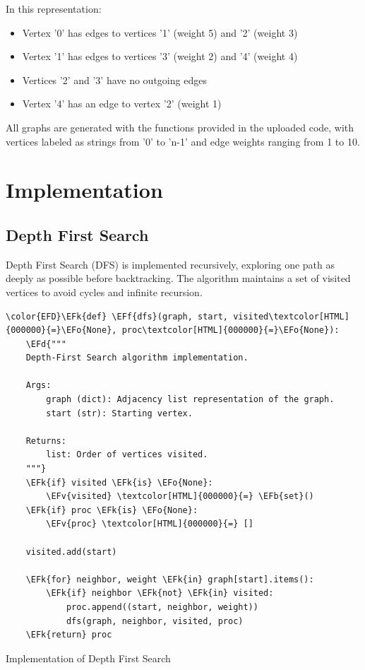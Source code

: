 \documentclass[a4paper,12pt]{article}
\newcommand{\EFd}[1]{\textcolor{EFd}{#1}} %
\newcommand{\EFk}[1]{\textcolor{EFk}{#1}} %
\newcommand{\EFb}[1]{\textcolor{EFb}{#1}} %
\newcommand{\EFf}[1]{\textcolor{EFf}{#1}} %
\newcommand{\EFv}[1]{\textcolor{EFv}{#1}} %
\newcommand{\EFo}[1]{\textcolor{EFo}{#1}} %
\begin{document}
In this representation:
\begin{itemize}
\item Vertex '0' has edges to vertices '1' (weight 5) and '2' (weight 3)
\item Vertex '1' has edges to vertices '3' (weight 2) and '4' (weight 4)
\item Vertices '2' and '3' have no outgoing edges
\item Vertex '4' has an edge to vertex '2' (weight 1)
\end{itemize}

All graphs are generated with the functions provided in the uploaded code, with vertices labeled as strings from '0' to 'n-1' and edge weights ranging from 1 to 10.
\section{Implementation}
\label{sec:org1ac15dd}
\subsection{Depth First Search}
\label{sec:orgfe46ea9}
Depth First Search (DFS) is implemented recursively, exploring one path as deeply as possible before backtracking. The algorithm maintains a set of visited vertices to avoid cycles and infinite recursion.

\begin{listing}[htbp]
\begin{Code}
\begin{Verbatim}
\color{EFD}\EFk{def} \EFf{dfs}(graph, start, visited\textcolor[HTML]{000000}{=}\EFo{None}, proc\textcolor[HTML]{000000}{=}\EFo{None}):
    \EFd{"""
    Depth-First Search algorithm implementation.

    Args:
        graph (dict): Adjacency list representation of the graph.
        start (str): Starting vertex.

    Returns:
        list: Order of vertices visited.
    """}
    \EFk{if} visited \EFk{is} \EFo{None}:
        \EFv{visited} \textcolor[HTML]{000000}{=} \EFb{set}()
    \EFk{if} proc \EFk{is} \EFo{None}:
        \EFv{proc} \textcolor[HTML]{000000}{=} []

    visited.add(start)

    \EFk{for} neighbor, weight \EFk{in} graph[start].items():
        \EFk{if} neighbor \EFk{not} \EFk{in} visited:
            proc.append((start, neighbor, weight))
            dfs(graph, neighbor, visited, proc)
    \EFk{return} proc
\end{Verbatim}
\end{Code}
\caption{\label{lst:org46ace5f}Implementation of Depth First Search}
\end{listing}
\end{document}
